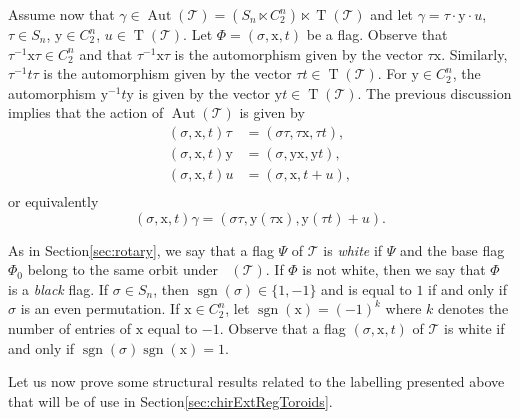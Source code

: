 \documentclass[final]{amsart}
\theoremstyle{plain}
\theoremstyle{definition}
\theoremstyle{remark}
\numberwithin{equation}{section}
\renewcommand{\{}{\lbrace}
\renewcommand{\}}{\rbrace}
\newcommand{\cT}{\mathcal{T}}
\newcommand{\cyvec}[1]{{\mathrm{#1}}}
\newcommand{\vx}{\cyvec{x}}
\newcommand{\vy}{\cyvec{y}}
\DeclareMathOperator{\sgn}{sgn}
\DeclareMathOperator{\aut}{Aut} \DeclareMathOperator{\autp}{\aut^{+}}
\newcommand{\cyctwo}[1][n]{ C_{2}^{#1} }
\DeclareMathOperator{\tras}{T}
\begin{document}
Assume now that $ \gamma \in \aut(\cT) = (S_{n} \ltimes \cyctwo) \ltimes \tras (\cT)$ and let $\gamma = \tau \cdot \vy \cdot u$, $\tau \in S_n$, $\vy \in \cyctwo$, $u \in \tras(\cT)$.
Let $\Phi = (\sigma, \vx, t)$ be a flag. 
Observe that $\tau^{-1} \vx \tau \in \cyctwo$ and that $\tau^{-1} \vx \tau$ is the automorphism given by the vector $\tau \vx$. 
Similarly, $\tau^{-1} t \tau$ is the automorphism given by the vector $\tau t \in \tras (\cT)$. 
For $\vy \in \cyctwo$, the automorphism $\vy^{-1} t \vy$ is given by the vector $\vy t \in \tras (\cT) $. 
The previous discussion implies that the action of $\aut(\cT)$ is given by
\begin{equation}\label{eq:autOnLabels_s}
  \begin{aligned}
    (\sigma, \vx, t) \tau &= (\sigma \tau, \tau \vx, \tau t),\\
    (\sigma, \vx, t) \vy &= (\sigma, \vy \vx, \vy t), \\
    (\sigma, \vx, t) u &= (\sigma, \vx, t + u), \\
  \end{aligned}
\end{equation}
or equivalently 
\begin{equation}\label{eq:autOnLabels}
(\sigma, \vx, t)\gamma = (\sigma \tau , \vy(\tau \vx),\vy(\tau t) + u ).
\end{equation}

As in Section\nobreakspace \ref {sec:rotary}, we  say that a flag $\Psi$ of $\cT$ is \emph{white} if $\Psi$  and the base flag $\Phi_{0}$ belong to the same orbit under $\autp(\cT)$. 
If $\Phi$ is not white, then we say that $\Phi$ is a \emph{black} flag.  
If $\sigma \in S_{n}$, then $\sgn(\sigma)\in \{1,-1\}$ and is equal to $1$ if and only if $\sigma$ is an even permutation. 
If $\vx \in \cyctwo$, let $\sgn(\vx) = (-1)^{k}$ where $k$ denotes the number of entries of $\vx$ equal to $-1$. 
Observe that a flag $(\sigma, \vx, t)$ of $\cT$ is white if and only if $\sgn(\sigma)\sgn(\vx) = 1$.

Let us now prove some structural results related to the labelling presented above that will be of use in Section\nobreakspace \ref {sec:chirExtRegToroids}.
\end{document}
